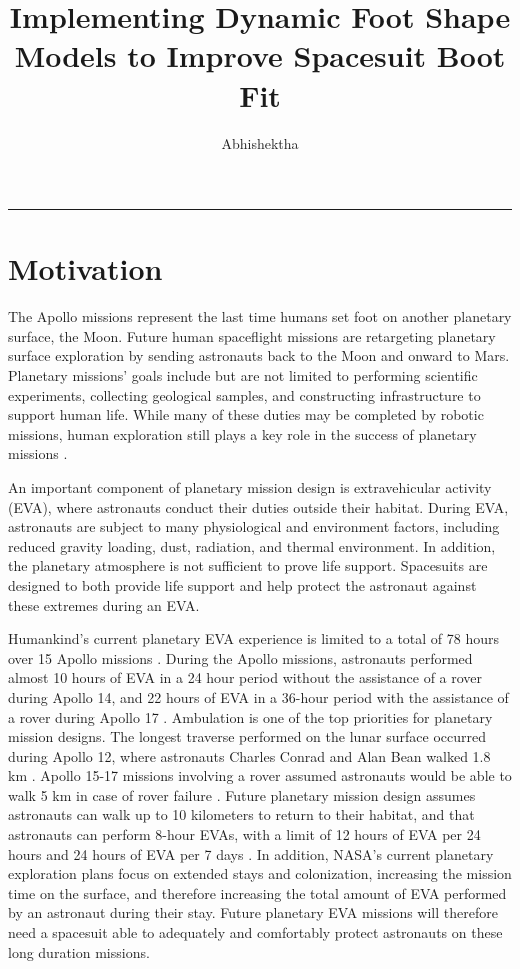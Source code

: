 \documentclass[defaultstyle,11pt]{comps}
\title{Implementing Dynamic Foot Shape Models to Improve Spacesuit Boot Fit}
\author{Abhishektha}{Boppana}
\begin{document}
\begin{center}\rule{0.5\linewidth}{0.5pt}\end{center}

\hypertarget{chapter:motiv}{%
\chapter{Motivation}\label{chapter:motiv}}

The Apollo missions represent the last time humans set foot on another planetary surface, the Moon.
Future human spaceflight missions are retargeting planetary surface exploration by sending astronauts back to the Moon and onward to Mars.
Planetary missions' goals include but are not limited to performing scientific experiments, collecting geological samples, and constructing infrastructure to support human life.
While many of these duties may be completed by robotic missions, human exploration still plays a key role in the success of planetary missions \citep{Drake2010}.

An important component of planetary mission design is extravehicular activity (EVA), where astronauts conduct their duties outside their habitat.
During EVA, astronauts are subject to many physiological and environment factors, including reduced gravity loading, dust, radiation, and thermal environment.
In addition, the planetary atmosphere is not sufficient to prove life support.
Spacesuits are designed to both provide life support and help protect the astronaut against these extremes during an EVA.

Humankind's current planetary EVA experience is limited to a total of 78 hours over 15 Apollo missions \citep{Portree1997}.
During the Apollo missions, astronauts performed almost 10 hours of EVA in a 24 hour period without the assistance of a rover during Apollo 14, and 22 hours of EVA in a 36-hour period with the assistance of a rover during Apollo 17 \citep{Portree1997}.
Ambulation is one of the top priorities for planetary mission designs.
The longest traverse performed on the lunar surface occurred during Apollo 12, where astronauts Charles Conrad and Alan Bean walked 1.8 km \citep{Portree1997}.
Apollo 15-17 missions involving a rover assumed astronauts would be able to walk 5 km in case of rover failure \citep{Portree1997}.
Future planetary mission design assumes astronauts can walk up to 10 kilometers to return to their habitat, and that astronauts can perform 8-hour EVAs, with a limit of 12 hours of EVA per 24 hours and 24 hours of EVA per 7 days \citep{Drake2010}.
In addition, NASA's current planetary exploration plans focus on extended stays and colonization, increasing the mission time on the surface, and therefore increasing the total amount of EVA performed by an astronaut during their stay.
Future planetary EVA missions will therefore need a spacesuit able to adequately and comfortably protect astronauts on these long duration missions.
\end{document}
